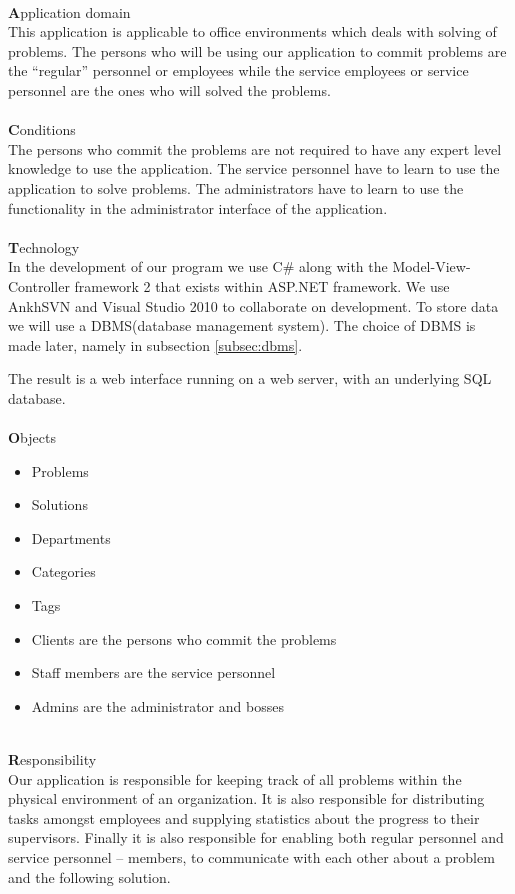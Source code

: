 \ \\
{\Large \textbf{A}}pplication domain \\
This application is applicable to office environments which deals with solving of problems.
The persons who will be using our application to commit problems are the ``regular'' personnel or employees while the service employees or service personnel are the ones who will solved the problems.\\
\ \\
{\Large \textbf{C}}onditions \\ 
The persons who commit the problems are not required to have any expert level knowledge to use the application.
The service personnel have to learn to use the application to solve problems.
The administrators have to learn to use the functionality in the administrator interface of the application. \\
\ \\
{\Large \textbf{T}}echnology \\
In the development of our program we use C\# along with the Model-View-Controller framework 2 that exists within ASP.NET framework.
We use AnkhSVN and Visual Studio 2010 to collaborate on development.
To store data we will use a DBMS(database management system).
The choice of DBMS is made later, namely in subsection \ref{subsec:dbms}.

The result is a web interface running on a web server, with an underlying SQL database.\\
\ \\
{\Large \textbf{O}}bjects
\begin{itemize}
	\item Problems
	\item Solutions
	\item Departments
	\item Categories
	\item Tags
	\item Clients are the persons who commit the problems
	\item Staff members are the service personnel
	\item Admins are the administrator and bosses					
\end{itemize}

\ \\
{\Large \textbf{R}}esponsibility \\
Our application is responsible for keeping track of all problems within the physical environment of an organization.
It is also responsible for distributing tasks amongst employees and supplying statistics about the progress to their supervisors.
Finally it is also responsible for enabling both regular personnel and service personnel -- \astaff[] members, to communicate with each other about a problem and the following solution.

